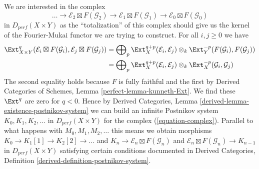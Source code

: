 \medskip\noindent
We are interested in the complex
\begin{equation}
\label{equation-complex}
\ldots \to
\mathcal{E}_2 \boxtimes F(\mathcal{G}_2) \to
\mathcal{E}_1 \boxtimes F(\mathcal{G}_1) \to
\mathcal{E}_0 \boxtimes F(\mathcal{G}_0)
\end{equation}
in $D_{perf}(X \times Y)$ as the ``totalization'' of this complex should
give us the kernel of the Fourier-Mukai functor we are trying to construct.
For all $i, j \geq 0$ we have
\begin{align*}
\Ext^q_{X \times Y}(\mathcal{E}_i \boxtimes F(\mathcal{G}_i),
\mathcal{E}_j \boxtimes F(\mathcal{G}_j))
& =
\bigoplus\nolimits_p
\Ext^{q + p}_X(\mathcal{E}_i, \mathcal{E}_j) \otimes_k
\Ext^{-p}_Y(F(\mathcal{G}_i), F(\mathcal{G}_j)) \\
& =
\bigoplus\nolimits_p
\Ext^{q + p}_X(\mathcal{E}_i, \mathcal{E}_j) \otimes_k
\Ext^{-p}_X(\mathcal{G}_i, \mathcal{G}_j)
\end{align*}
The second equality holds because $F$ is
fully faithful and the first by
Derived Categories of Schemes, Lemma \ref{perfect-lemma-kunneth-Ext}.
We find these $\Ext^q$ are zero for $q < 0$.
Hence by
Derived Categories, Lemma \ref{derived-lemma-existence-postnikov-system}
we can build an infinite Postnikov system $K_0, K_1, K_2, \ldots$
in $D_{perf}(X \times Y)$ for the complex (\ref{equation-complex}).
Parallel to what happens with $M_0, M_1, M_2, \ldots$ this means we
obtain morphisms
$K_0 \to K_1[1] \to K_2[2] \to \ldots$ and
$K_n \to \mathcal{E}_n \boxtimes F(\mathcal{G}_n)$ and
$\mathcal{E}_n \boxtimes F(\mathcal{G}_n) \to K_{n - 1}$
in $D_{perf}(X \times Y)$
satisfying certain conditions documented in
Derived Categories, Definition \ref{derived-definition-postnikov-system}.

